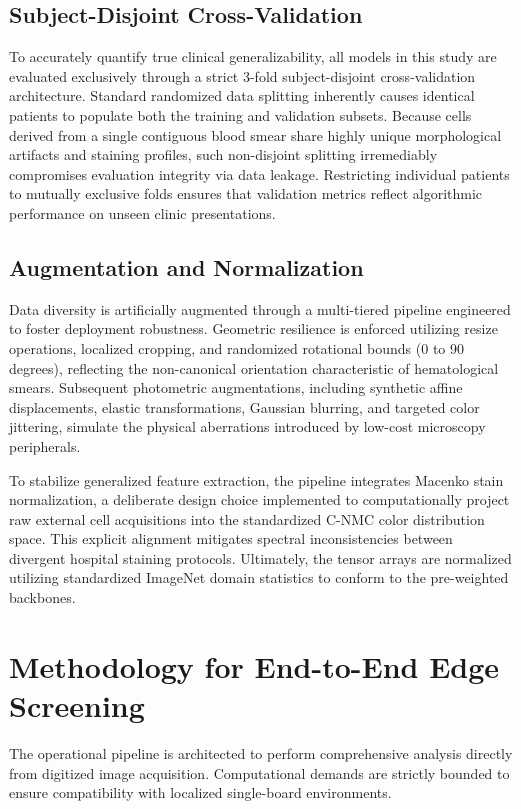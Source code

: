 \documentclass[journal]{IEEEtran}
\begin{document}
\subsection{Subject-Disjoint Cross-Validation}
To accurately quantify true clinical generalizability, all models in this study are evaluated exclusively through a strict 3-fold subject-disjoint cross-validation architecture. Standard randomized data splitting inherently causes identical patients to populate both the training and validation subsets. Because cells derived from a single contiguous blood smear share highly unique morphological artifacts and staining profiles, such non-disjoint splitting irremediably compromises evaluation integrity via data leakage. Restricting individual patients to mutually exclusive folds ensures that validation metrics reflect algorithmic performance on unseen clinic presentations.

\subsection{Augmentation and Normalization}
Data diversity is artificially augmented through a multi-tiered pipeline engineered to foster deployment robustness. Geometric resilience is enforced utilizing resize operations, localized cropping, and randomized rotational bounds (0 to 90 degrees), reflecting the non-canonical orientation characteristic of hematological smears. Subsequent photometric augmentations, including synthetic affine displacements, elastic transformations, Gaussian blurring, and targeted color jittering, simulate the physical aberrations introduced by low-cost microscopy peripherals.

To stabilize generalized feature extraction, the pipeline integrates Macenko stain normalization, a deliberate design choice implemented to computationally project raw external cell acquisitions into the standardized C-NMC color distribution space. This explicit alignment mitigates spectral inconsistencies between divergent hospital staining protocols. Ultimately, the tensor arrays are normalized utilizing standardized ImageNet domain statistics to conform to the pre-weighted backbones.

\section{Methodology for End-to-End Edge Screening}
The operational pipeline is architected to perform comprehensive analysis directly from digitized image acquisition. Computational demands are strictly bounded to ensure compatibility with localized single-board environments.
\end{document}
